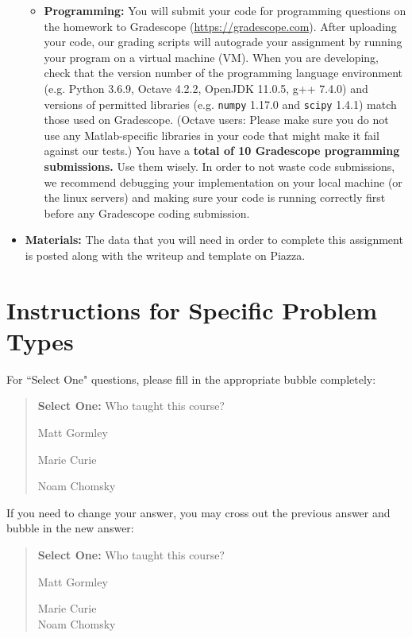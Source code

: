 \documentclass[11pt]{article}
\numberwithin{equation}{section} %
\numberwithin{figure}{section} %
\numberwithin{table}{section} %
\begin{document}
\begin{itemize}
\begin{itemize}
  \item \textbf{Programming:} You will submit your code for programming questions on the homework to Gradescope (\url{https://gradescope.com}). After uploading your code, our grading scripts will autograde your assignment by running your program on a virtual machine (VM). When you are developing, check that the version number of the programming language environment (e.g. Python 3.6.9, Octave 4.2.2, OpenJDK 11.0.5, g++ 7.4.0) and versions of permitted libraries (e.g.  \texttt{numpy} 1.17.0 and \texttt{scipy} 1.4.1) match those used on Gradescope. (Octave users: Please make sure you do not use any Matlab-specific libraries in your code that might make it fail against our tests.) You have a \textbf{total of 10 Gradescope programming submissions.} Use them wisely. In order to not waste code submissions, we recommend debugging your implementation on your local machine (or the linux servers) and making sure your code is running correctly first before any Gradescope coding submission.

  \end{itemize}
  
\item\textbf{Materials:} The data that you will need in order to complete this assignment is posted along with the writeup and template on Piazza.

\end{itemize}

\clearpage
\section*{Instructions for Specific Problem Types}

For ``Select One" questions, please fill in the appropriate bubble completely:

\begin{quote}
\textbf{Select One:} Who taught this course?
\begin{list}{}
     \item\CIRCLE{} Matt Gormley
     \item\Circle{} Marie Curie
     \item\Circle{} Noam Chomsky
\end{list}
\end{quote}

If you need to change your answer, you may cross out the previous answer and bubble in the new answer:

\begin{quote}
\textbf{Select One:} Who taught this course?
\begin{list}{}
     \item\CIRCLE{} Matt Gormley
     \item\Circle{} Marie Curie\\
     \xcancel{\CIRCLE}{} Noam Chomsky
\end{list}
\end{quote}
\end{document}
